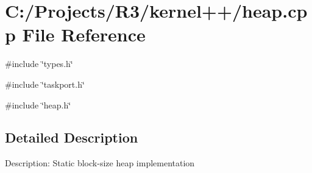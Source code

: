 \section{C:/Projects/R3/kernel++/heap.cpp File Reference}
\label{heap_8cpp}
{\ttfamily \#include \char`\"{}types.h\char`\"{}}\par
{\ttfamily \#include \char`\"{}taskport.h\char`\"{}}\par
{\ttfamily \#include \char`\"{}heap.h\char`\"{}}\par


\subsection{Detailed Description}
Description: Static block-\/size heap implementation 